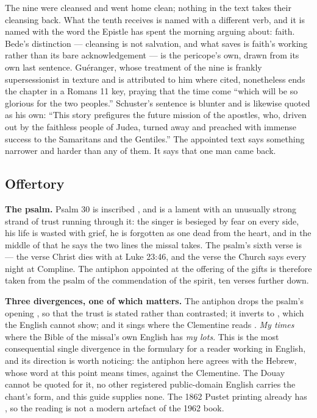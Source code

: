  The nine were cleansed and
went home clean; nothing in the text takes their cleansing back. What the tenth
receives is named with a different verb, and it is named with the word the
Epistle has spent the morning arguing about: faith. Bede's distinction ---
cleansing is not salvation, and what saves is faith's working rather than its
bare acknowledgement --- is the pericope's own, drawn from its own last
sentence. Guéranger, whose treatment of the nine is frankly supersessionist in
texture and is attributed to him where cited, nonetheless ends the chapter in a
Romans 11 key, praying that the time come ``which will be so glorious for the
two peoples.'' Schuster's sentence is blunter and is likewise quoted as his
own: ``This story prefigures the future mission of the apostles, who, driven
out by the faithless people of Judea, turned away and preached with immense
success to the Samaritans and the Gentiles.'' The appointed text says
something narrower and harder than any of them. It says that one man came
back.

\elementguard
\subsection*{Offertory }


\textbf{The psalm.} Psalm 30 is inscribed , and is a lament with an unusually strong strand of trust running
through it: the singer is besieged by fear on every side, his life is wasted
with grief, he is forgotten as one dead from the heart, and in the middle of
that he says the two lines the missal takes. The psalm's sixth verse is
 --- the verse Christ dies with at
Luke 23:46, and the verse the Church says every night at Compline. The
antiphon appointed at the offering of the gifts is therefore taken from the
psalm of the commendation of the spirit, ten verses further down.

\textbf{Three divergences, one of which matters.} The antiphon drops the
psalm's opening , so that the trust is stated rather than
contrasted; it inverts  to ,
which the English cannot show; and it sings  where the Clementine reads . \textit{My times} where the
Bible of the missal's own English has \textit{my lots}. This is the most
consequential single divergence in the formulary for a reader working in
English, and its direction is worth noticing: the antiphon here agrees with the
Hebrew, whose word at this point means times, against the Clementine. The
Douay cannot be quoted for it, no other registered public-domain English
carries the chant's form, and this guide supplies none. The 1862 Pustet
printing already has , so the reading is not a modern
artefact of the 1962 book.

